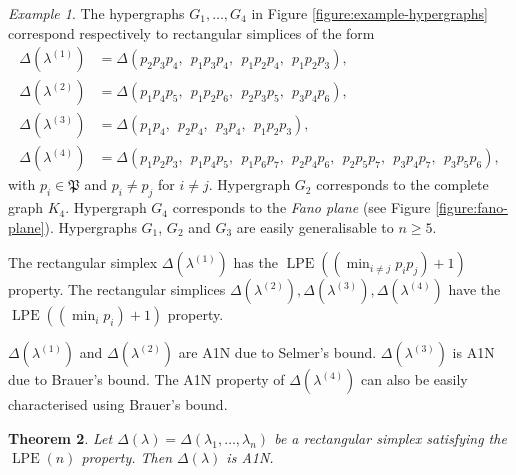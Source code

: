 \documentclass[a4paper,11pt]{amsart}
\theoremstyle{plain}
\newtheorem{theorem}{Theorem}[section]
\theoremstyle{definition}
\theoremstyle{remark}
\newtheorem{example}[theorem]{Example}
\DeclareMathOperator{\LPE}{LPE}
\begin{document}
\begin{example}\label{example:hypergraphs-lpe-a1n}
    The hypergraphs $G_1, \ldots, G_4$ in Figure \ref{figure:example-hypergraphs} correspond respectively to rectangular simplices of the form
    \begin{align*}
        \Delta(\lambda^{(1)}) &= \Delta(p_2p_3p_4,~~p_1p_3p_4,~~p_1p_2p_4,~~p_1p_2p_3), \\
        \Delta(\lambda^{(2)}) &= \Delta(p_1p_4p_5,~~p_1p_2p_6,~~p_2p_3p_5,~~p_3p_4p_6), \\
        \Delta(\lambda^{(3)}) &= \Delta(p_1p_4,~~p_2p_4,~~p_3p_4,~~p_1p_2p_3), \\
        \Delta(\lambda^{(4)}) &= \Delta(p_1p_2p_3,~~p_1p_4p_5,~~p_1p_6p_7,~~p_2p_4p_6,~~p_2p_5p_7,~~p_3p_4p_7,~~p_3p_5p_6),
    \end{align*}
    with $p_i \in \mathfrak{P}$ and $p_i \neq p_j$ for $i \neq j$. Hypergraph $G_2$ corresponds to the complete graph $K_4$. Hypergraph $G_4$ corresponds to the \emph{Fano plane} (see Figure \ref{figure:fano-plane}). Hypergraphs $G_1$, $G_2$ and $G_3$ are easily generalisable to $n \geq 5$.

    The rectangular simplex $\Delta(\lambda^{(1)})$ has the $\LPE((\min_{i \neq j} p_ip_j) + 1)$ property. The rectangular simplices $\Delta(\lambda^{(2)}), \Delta(\lambda^{(3)}), \Delta(\lambda^{(4)})$ have the $\LPE((\min_{i} p_i) + 1)$ property.
    
    $\Delta(\lambda^{(1)})$ and $\Delta(\lambda^{(2)})$ are A1N due to Selmer's bound. $\Delta(\lambda^{(3)})$ is A1N due to Brauer's bound. The A1N property of $\Delta(\lambda^{(4)})$ can also be easily characterised using Brauer's bound.
\end{example}

\begin{theorem}\label{theorem:lpe-implies-a1n}
    Let $\Delta(\lambda) = \Delta(\lambda_1, \ldots, \lambda_n)$ be a rectangular simplex satisfying the $\LPE(n)$ property. Then $\Delta(\lambda)$ is A1N.
\end{theorem}
\end{document}
